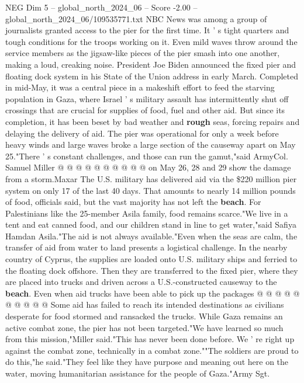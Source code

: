 \begin{textsample}{NEG Dim 5 – global\_north\_2024\_06 – Score -2.00 – global\_north\_2024\_06/109535771.txt}  \label{ex:f5_neg_083}
NBC News was among a group of journalists granted access to the pier for the first time.
It ' s tight quarters and tough conditions for the troops working on it.
Even mild waves throw around the service members as the jigsaw-like pieces of the pier smash into one another, making a loud, creaking noise.
President Joe Biden announced the fixed pier and floating dock system in his State of the Union address in early March.
Completed in mid-May, it was a central piece in a makeshift effort to feed the starving population in Gaza, where Israel ' s military assault has intermittently shut off crossings that are crucial for supplies of food, fuel and other aid.
But since its completion, it has been beset by bad weather and \textbf{rough} seas, forcing repairs and delaying the delivery of aid.
The pier was operational for only a week before heavy winds and large waves broke a large section of the causeway apart on May 25."There ' s constant challenges, and those can run the gamut,"said ArmyCol.
Samuel Miller @ @ @ @ @ @ @ @ @ @ on May 26, 28 and 29 show the damage from a storm.Maxar The U.S. military has delivered aid via the \$220 million pier system on only 17 of the last 40 days.
That amounts to nearly 14 million pounds of food, officials said, but the vast majority has not left the \textbf{beach}.
For Palestinians like the 25-member Asila family, food remains scarce."We live in a tent and eat canned food, and our children stand in line to get water,"said Safiya Hamdan Asila."The aid is not always available."Even when the seas are calm, the transfer of aid from water to land presents a logistical challenge.
In the nearby country of Cyprus, the supplies are loaded onto U.S. military ships and ferried to the floating dock offshore.
Then they are transferred to the fixed pier, where they are placed into trucks and driven across a U.S.-constructed causeway to the \textbf{beach}.
Even when aid trucks have been able to pick up the packages @ @ @ @ @ @ @ @ @ @ Some aid has failed to reach its intended destinations as civilians desperate for food stormed and ransacked the trucks.
While Gaza remains an active combat zone, the pier has not been targeted."We have learned so much from this mission,"Miller said."This has never been done before.
We ' re right up against the combat zone, technically in a combat zone.""The soldiers are proud to do this,"he said."They feel like they have purpose and meaning out here on the water, moving humanitarian assistance for the people of Gaza."Army Sgt.

\end{textsample}
